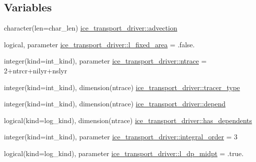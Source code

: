 \subsection*{Variables}
\begin{DoxyCompactItemize}
\item 
character(len=char\_\-len) \hyperlink{namespaceice__transport__driver_a1c58448ed0a2533736be3ffabe94127f}{ice\_\-transport\_\-driver::advection}
\item 
logical, parameter \hyperlink{namespaceice__transport__driver_ad4c977aa8b5dab5551cb2b87392ff8eb}{ice\_\-transport\_\-driver::l\_\-fixed\_\-area} = .false.
\item 
integer(kind=int\_\-kind), parameter \hyperlink{namespaceice__transport__driver_acd10161556f58f5f0de2dadd68565201}{ice\_\-transport\_\-driver::ntrace} = 2+ntrcr+nilyr+nslyr
\item 
integer(kind=int\_\-kind), dimension(ntrace) \hyperlink{namespaceice__transport__driver_a04137caf1a5335b66116ec171d0bfe44}{ice\_\-transport\_\-driver::tracer\_\-type}
\item 
integer(kind=int\_\-kind), dimension(ntrace) \hyperlink{namespaceice__transport__driver_ab13adb14cbe8d413f23beb0e75252023}{ice\_\-transport\_\-driver::depend}
\item 
logical(kind=log\_\-kind), dimension(ntrace) \hyperlink{namespaceice__transport__driver_a377931b1b7093fce2f15ea1930370cd1}{ice\_\-transport\_\-driver::has\_\-dependents}
\item 
integer(kind=int\_\-kind), parameter \hyperlink{namespaceice__transport__driver_aeed35e7d53b7d7304b207337c111028b}{ice\_\-transport\_\-driver::integral\_\-order} = 3
\item 
logical(kind=log\_\-kind), parameter \hyperlink{namespaceice__transport__driver_a246442f9a224a039eee37618a4cc0751}{ice\_\-transport\_\-driver::l\_\-dp\_\-midpt} = .true.
\end{DoxyCompactItemize}

